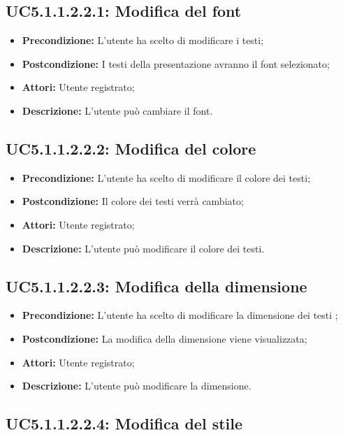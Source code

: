 \subsection{ UC5.1.1.2.2.1: Modifica del font}

\begin{itemize}
	\item \textbf{Precondizione:} L'utente ha scelto di modificare i testi;
	\item \textbf{Postcondizione:} I testi della presentazione avranno il font selezionato;
	\item \textbf{Attori:} Utente registrato;
	\item \textbf{Descrizione:} L'utente può cambiare il font.
\end{itemize}
\subsection{ UC5.1.1.2.2.2: Modifica del colore}

\begin{itemize}
	\item \textbf{Precondizione:} L'utente ha scelto di modificare il colore dei testi;
	\item \textbf{Postcondizione:} Il colore dei testi verrà cambiato;
	\item \textbf{Attori:} Utente registrato;
	\item \textbf{Descrizione:} L'utente può modificare il colore dei testi.
\end{itemize}
\subsection{ UC5.1.1.2.2.3: Modifica della dimensione }

\begin{itemize}
	\item \textbf{Precondizione:} L'utente ha scelto di modificare la dimensione dei testi ;
	\item \textbf{Postcondizione:} La modifica della dimensione viene visualizzata;
	\item \textbf{Attori:} Utente registrato;
	\item \textbf{Descrizione:} L'utente può modificare la dimensione.
\end{itemize}
\subsection{ UC5.1.1.2.2.4: Modifica del stile}

